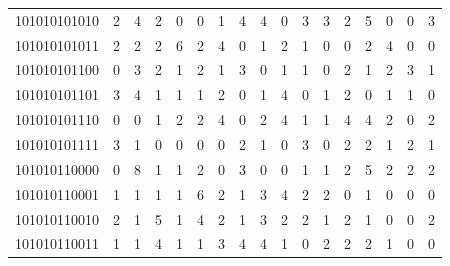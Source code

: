 \documentclass[10pt,a4paper]{article}
\begin{document}
\begin{longtable}{ |c|c|c|c|c|c|c|c|c|c|c|c|c|c|c|c|c| }
    101010101010              & 2                            & 4                                & 2                            & 0                              & 0   & 1   & 4   & 4   & 0   & 3   & 3   & 2   & 5   & 0   & 0   & 3   \\
    101010101011              & 2                            & 2                                & 2                            & 6                              & 2   & 4   & 0   & 1   & 2   & 1   & 0   & 0   & 2   & 4   & 0   & 0   \\
    101010101100              & 0                            & 3                                & 2                            & 1                              & 2   & 1   & 3   & 0   & 1   & 1   & 0   & 2   & 1   & 2   & 3   & 1   \\
    101010101101              & 3                            & 4                                & 1                            & 1                              & 1   & 2   & 0   & 1   & 4   & 0   & 1   & 2   & 0   & 1   & 1   & 0   \\
    101010101110              & 0                            & 0                                & 1                            & 2                              & 2   & 4   & 0   & 2   & 4   & 1   & 1   & 4   & 4   & 2   & 0   & 2   \\
    101010101111              & 3                            & 1                                & 0                            & 0                              & 0   & 0   & 2   & 1   & 0   & 3   & 0   & 2   & 2   & 1   & 2   & 1   \\
    101010110000              & 0                            & 8                                & 1                            & 1                              & 2   & 0   & 3   & 0   & 0   & 1   & 1   & 2   & 5   & 2   & 2   & 2   \\
    101010110001              & 1                            & 1                                & 1                            & 1                              & 6   & 2   & 1   & 3   & 4   & 2   & 2   & 0   & 1   & 0   & 0   & 0   \\
    101010110010              & 2                            & 1                                & 5                            & 1                              & 4   & 2   & 1   & 3   & 2   & 2   & 1   & 2   & 1   & 0   & 0   & 2   \\
    101010110011              & 1                            & 1                                & 4                            & 1                              & 1   & 3   & 4   & 4   & 1   & 0   & 2   & 2   & 2   & 1   & 0   & 0   \\

\end{longtable}
\end{document}
